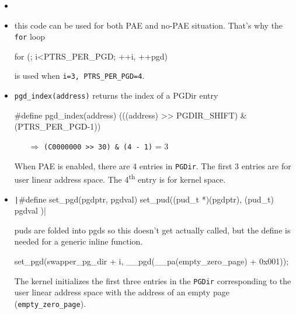 \begin{itemize}
\item {}
\item this code can be used for both PAE and no-PAE situation. That's why the \texttt{for}
  loop
  \begin{center}
\begin{ccode}
    for (; i<PTRS_PER_PGD; ++i, ++pgd)
\end{ccode}
  \end{center}
  
  is used when \texttt{i=3, PTRS\_PER\_PGD=4}.
\item \texttt{pgd\_index(address)} returns the index of a PGDir entry
  \begin{center}
\begin{ccode}
#define pgd_index(address) (((address) >> PGDIR_SHIFT) & (PTRS_PER_PGD-1))
\end{ccode}
  \end{center}
  
  \begin{itemize}
  \item[$\Rightarrow$] \texttt{(C0000000 >> 30) \& (4 - 1)} = 3
  \end{itemize}

  When PAE is enabled, there are 4 entries in \texttt{PGDir}. The first 3 entries are for
  user linear address space. The 4\textsuperscript{th} entry is for kernel space.
\item \texttt|#define set_pgd(pgdptr, pgdval) set_pud((pud_t *)(pgdptr), (pud_t) { pgdval })|

  puds are folded into pgds so this doesn't get actually called, but the define is needed
  for a generic inline function.
  \begin{center}
\begin{ccode}
set_pgd(swapper_pg_dir + i, __pgd(__pa(empty_zero_page) + 0x001));
\end{ccode}
  \end{center}
  
  The kernel initializes the first three entries in the \texttt{PGDir} corresponding to the
  user linear address space with the address of an empty page (\texttt{empty\_zero\_page}).


\end{itemize}
